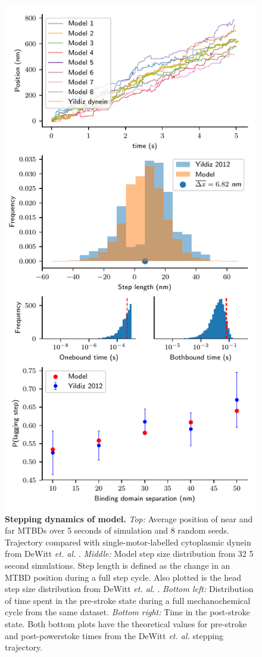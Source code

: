 \documentclass[9pt,twocolumn,twoside]{article}
\begin{document}
\begin{figure}[tbhp]
  \centering
  \includegraphics[width=\linewidth]{../../plots/paper_model_behavior}
\caption{\textbf{Stepping dynamics of model.} \textit{Top: } Average position of near and far MTBDs over 5 seconds of simulation and 8 random seeds. Trajectory compared with single-motor-labelled cytoplasmic dynein from DeWitt \textit{et. al.} \cite{yildizpaper}. \textit{Middle: } Model step size distribution from 32 5 second simulations. Step length is defined as the change in an MTBD position during a full step cycle. Also plotted is the head step size distribution from DeWitt \textit{et. al.} \cite{yildizpaper}. \textit{Bottom left: } Distribution of time spent in the pre-stroke state during a full mechanochemical cycle from the same dataset. \textit{Bottom right: } Time in the post-stroke state. Both bottom plots have the theoretical values for pre-stroke and post-powerstoke times from the DeWitt \textit{et. al.} stepping trajectory.}

\end{figure}
\end{document}
